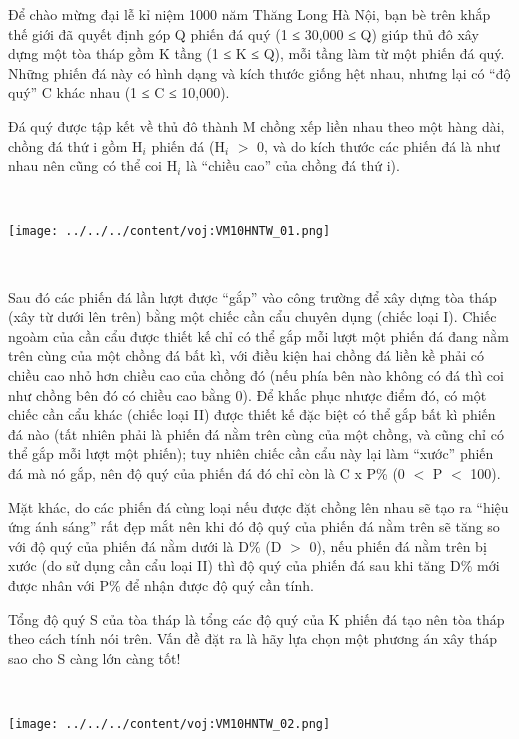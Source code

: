 

Để chào mừng đại lễ kỉ niệm 1000 năm Thăng Long Hà Nội, bạn bè trên khắp thế giới đã quyết định góp Q phiến đá quý (1 ≤ 30,000 ≤ Q) giúp thủ đô xây dựng một tòa tháp gồm K tầng (1 ≤ K ≤ Q), mỗi tầng làm từ một phiến đá quý. Những phiến đá này có hình dạng và kích thước giống hệt nhau, nhưng lại có “độ quý” C khác nhau (1 ≤ C ≤ 10,000).

Đá quý được tập kết về thủ đô thành M chồng xếp liền nhau theo một hàng dài, chồng đá thứ i gồm H$_i$ phiến đá (H$_i$ $>$ 0, và do kích thước các phiến đá là như nhau nên cũng có thể coi H$_i$ là “chiều cao” của chồng đá thứ i).

 


\texttt{[image: ../../../content/voj:VM10HNTW\_01.png]}

 

Sau đó các phiến đá lần lượt được “gắp” vào công trường để xây dựng tòa tháp (xây từ dưới lên trên) bằng một chiếc cần cẩu chuyên dụng (chiếc loại I). Chiếc ngoàm của cần cẩu được thiết kế chỉ có thể gắp mỗi lượt một phiến đá đang nằm trên cùng của một chồng đá bất kì, với điều kiện hai chồng đá liền kề phải có chiều cao nhỏ hơn chiều cao của chồng đó (nếu phía bên nào không có đá thì coi như chồng bên đó có chiều cao bằng 0). Để khắc phục nhược điểm đó, có một chiếc cần cẩu khác (chiếc loại II) được thiết kế đặc biệt có thể gắp bất kì phiến đá nào (tất nhiên phải là phiến đá nằm trên cùng của một chồng, và cũng chỉ có thể gắp mỗi lượt một phiến); tuy nhiên chiếc cần cẩu này lại làm “xước” phiến đá mà nó gắp, nên độ quý của phiến đá đó chỉ còn là C x P\% (0 $<$ P $<$ 100).

Mặt khác, do các phiến đá cùng loại nếu được đặt chồng lên nhau sẽ tạo ra “hiệu ứng ánh sáng” rất đẹp mắt nên khi đó độ quý của phiến đá nằm trên sẽ tăng so với độ quý của phiến đá nằm dưới là D\% (D $>$ 0), nếu phiến đá nằm trên bị xước (do sử dụng cần cẩu loại II) thì độ quý của phiến đá sau khi tăng D\% mới được nhân với P\% để nhận được độ quý cần tính.

Tổng độ quý S của tòa tháp là tổng các độ quý của K phiến đá tạo nên tòa tháp theo cách tính nói trên. Vấn đề đặt ra là hãy lựa chọn một phương án xây tháp sao cho S càng lớn càng tốt!

 


\texttt{[image: ../../../content/voj:VM10HNTW\_02.png]}

 

